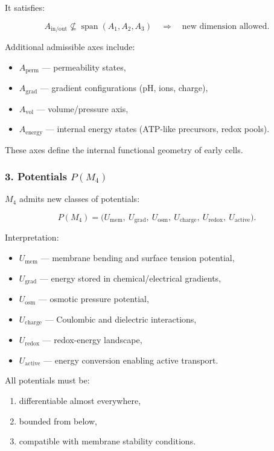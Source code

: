 It satisfies:

\[
A_{\mathrm{in/out}} \not\subseteq \operatorname{span}(A_1, A_2, A_3)
\quad\Rightarrow\quad
\text{new dimension allowed}.
\]

Additional admissible axes include:

\begin{itemize}
    \item $A_{\mathrm{perm}}$ — permeability states,
    \item $A_{\mathrm{grad}}$ — gradient configurations (pH, ions, charge),
    \item $A_{\mathrm{vol}}$ — volume/pressure axis,
    \item $A_{\mathrm{energy}}$ — internal energy states
          (ATP-like precursors, redox pools).
\end{itemize}

These axes define the internal functional geometry of early cells.

\subsubsection*{3. Potentials \texorpdfstring{$P(M_4)$}{P(M_4)}}

$M_4$ admits new classes of potentials:

\[
P(M_4) =
\big(
U_{\mathrm{mem}},\
U_{\mathrm{grad}},\
U_{\mathrm{osm}},\
U_{\mathrm{charge}},\
U_{\mathrm{redox}},\
U_{\mathrm{active}}
\big).
\]

Interpretation:

\begin{itemize}
    \item $U_{\mathrm{mem}}$ — membrane bending and surface tension potential,
    \item $U_{\mathrm{grad}}$ — energy stored in chemical/electrical gradients,
    \item $U_{\mathrm{osm}}$ — osmotic pressure potential,
    \item $U_{\mathrm{charge}}$ — Coulombic and dielectric interactions,
    \item $U_{\mathrm{redox}}$ — redox-energy landscape,
    \item $U_{\mathrm{active}}$ — energy conversion enabling active transport.
\end{itemize}

All potentials must be:

\begin{enumerate}
    \item differentiable almost everywhere,
    \item bounded from below,
    \item compatible with membrane stability conditions.
\end{enumerate}

